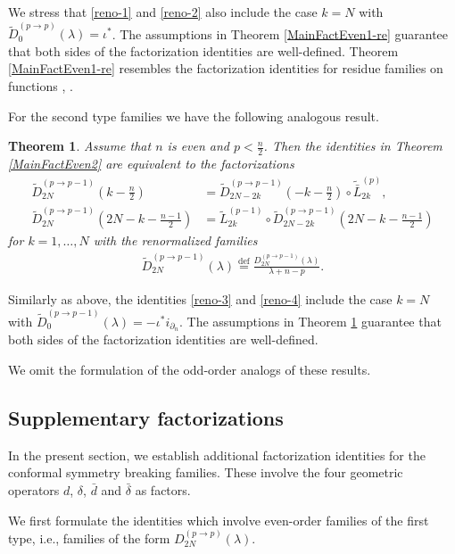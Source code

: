 \documentclass[a4paper,12pt,reqno]{amsart}
\newtheorem{theorem}{Theorem}
\numberwithin{theorem}{subsection}
\numberwithin{equation}{section}
\begin{document}
We stress that \eqref{reno-1} and \eqref{reno-2} also include the case $k=N$
with $\tilde{D}_0^{(p \to p)}(\lambda) = \iota^*$. The assumptions in Theorem
\ref{MainFactEven1-re} guarantee that both sides of the factorization
identities are well-defined. Theorem \ref{MainFactEven1-re} resembles the
factorization identities for residue families on functions \cite{Juhl},
\cite{Juhl1}.

For the second type families we have the following analogous result.

\begin{theorem}\label{MainFactEven2-re} Assume that $n$ is even and $p < \frac{n}{2}$.
Then the identities in Theorem \ref{MainFactEven2} are equivalent to the
factorizations
\begin{align}
   \tilde{D}_{2N}^{(p \to p-1)}(k\!-\!\tfrac{n}{2}) & =
   \tilde{D}_{2N-2k}^{(p \to p-1)}(-k\!-\!\tfrac{n}{2}) \circ \tilde{\bar{L}}_{2k}^{(p)}, \label{reno-3} \\
   \tilde{D}_{2N}^{(p \to p-1)}(2N\!-\!k\!-\!\tfrac{n-1}{2}) & =
   \tilde{L}_{2k}^{(p-1)} \circ
   \tilde{D}_{2N-2k}^{(p \to p-1)}(2N\!-\!k-\!\tfrac{n-1}{2}) \label{reno-4}
\end{align}
for $k=1,\dots,N$ with the renormalized families
\begin{align*}
   \tilde{D}_{2N}^{(p \to p-1)}(\lambda) {\stackrel{\text{def}}{=}} \frac{D_{2N}^{(p \to p-1)}(\lambda)}{\lambda\!+\!n\!-\!p}.
\end{align*}
\end{theorem}

Similarly as above, the identities \eqref{reno-3} and \eqref{reno-4} include
the case $k=N$ with $\tilde{D}_0^{(p \to p-1)}(\lambda) =
-\iota^*i_{\partial_n}$. The assumptions in Theorem \ref{MainFactEven2-re}
guarantee that both sides of the factorization identities are well-defined.

We omit the formulation of the odd-order analogs of these results.

\subsection{Supplementary factorizations}\label{factor2}

In the present section, we establish additional factorization identities for
the conformal symmetry breaking families. These involve the four geometric
operators ${d}$, $\delta$, $\bar{d}$ and $\bar{\delta}$ as factors.

We first formulate the identities which involve even-order families of the
first type, i.e., families of the form $D_{2N}^{(p \to p)}(\lambda)$.
\end{document}
